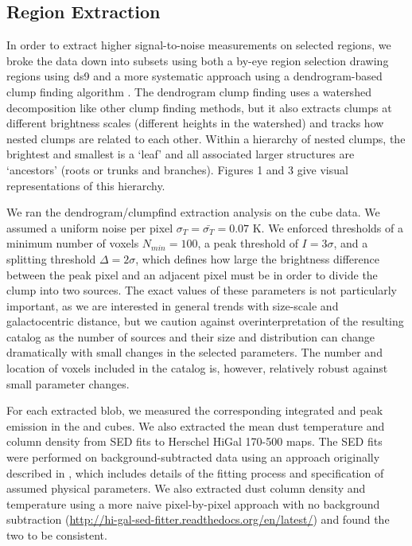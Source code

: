 \subsection{Region Extraction}
\label{sec:region}
In order to extract higher signal-to-noise measurements on selected regions, we
broke the data down into subsets using both a by-eye region selection drawing
regions using ds9 and a more systematic approach using a dendrogram-based clump
finding algorithm \citep[][\url{http://dendrograms.org/}]{Rosolowsky2008c}.
The dendrogram clump finding uses a watershed decomposition like other clump
finding methods, but it also extracts clumps at different brightness scales
(different heights in the watershed) and tracks how nested clumps are related
to each other.  Within a hierarchy of nested clumps, the brightest and smallest
is a `leaf' and all associated larger structures are `ancestors' (roots or
trunks and branches).
\citet{Rosolowsky2008c} Figures 1 and 3 give visual representations of this
hierarchy.


We ran the dendrogram/clumpfind extraction analysis on the 
\threeohthree cube data.  We assumed a uniform noise per pixel
$\sigma_{T}=\bar{\sigma_T}=0.07$ K.  We enforced thresholds of a minimum number of
voxels $N_{min}=100$, a peak threshold of $I = 3\sigma$, and a splitting
threshold $\Delta = 2\sigma$, which defines how large the brightness difference
between
the peak pixel and an adjacent pixel must be in order to divide the clump into two
sources.  The exact values of these parameters is not particularly
important, as we are interested in general trends with size-scale and
galactocentric distance, but we caution against overinterpretation of the
resulting catalog as the number of sources and their size and distribution can
change dramatically with small changes in the selected parameters.  The number
and location of voxels included in the catalog is, however, relatively robust
against small parameter changes.

For each extracted blob, we measured the corresponding integrated and peak
emission in the \threetwoone and \thirteenco cubes.  We also extracted the mean
dust temperature and column density from SED fits to Herschel HiGal 170-500\um
maps.  The SED fits were performed on background-subtracted data using an
approach originally described in \citet{Battersby2011a}, which includes details
of the fitting process and specification of assumed physical parameters.  We
also extracted dust column density and temperature using a more naive
pixel-by-pixel approach with no background subtraction
(\url{http://hi-gal-sed-fitter.readthedocs.org/en/latest/}) and found the two
to be consistent.

